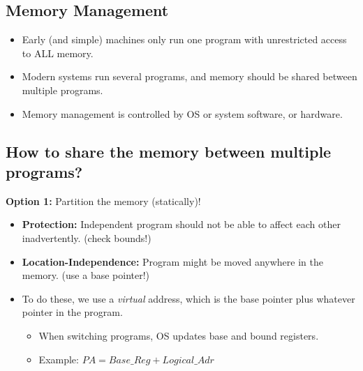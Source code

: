 \documentclass[10pt]{article}
\begin{document}
\subsection*{Memory Management}
\begin{itemize}
    \item Early (and simple) machines only run one program with unrestricted access to ALL memory.
    \item Modern systems run several programs, and memory should be shared between multiple programs.
    \item Memory management is controlled by OS or system software, or hardware.
\end{itemize}

\subsection*{How to share the memory between multiple programs?}
\textbf{Option 1:} Partition the memory (statically)!
\begin{itemize}
    \item \textbf{Protection:} Independent program should not be able to affect each other inadvertently.  (check bounds!)
    \item \textbf{Location-Independence:} Program might be moved anywhere in the memory.  (use a base pointer!)
    \item To do these, we use a \textit{virtual} address, which is the base pointer plus whatever pointer in the program.
    \begin{itemize}
        \item When switching programs, OS updates base and bound registers.
        \item Example: $PA = Base\_Reg + Logical\_Adr$
    \end{itemize}
\end{itemize}
\end{document}
